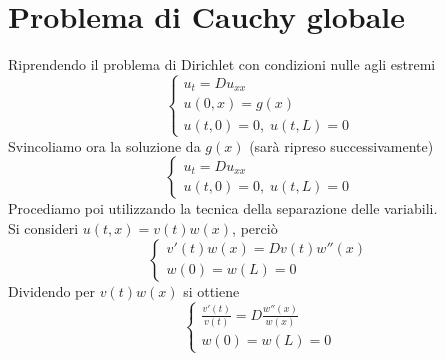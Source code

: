 \section{Problema di Cauchy globale}
Riprendendo il problema di Dirichlet con condizioni nulle agli estremi
\[
	\left\{
	\begin{array}{l}
		u_t=Du_{xx} \\
		u(0,x)=g(x) \\
		u(t,0)=0, \; u(t,L)=0
	\end{array}
	\right.
\]
Svincoliamo ora la soluzione da $g(x)$ (sar\`a ripreso successivamente)
\[
	\left\{
	\begin{array}{l}
		u_t=Du_{xx} \\
		u(t,0)=0, \; u(t,L)=0
	\end{array}
	\right.
\]
Procediamo poi utilizzando la tecnica della separazione delle variabili.\\
Si consideri $u(t,x)=v(t)w(x)$, perci\`o
\[
	\left\{
	\begin{array}{l}
		v'(t)w(x)=Dv(t)w''(x) \\
		w(0)=w(L)=0
	\end{array}
	\right.
\]
Dividendo per $v(t)w(x)$ si ottiene
\[
	\left\{
	\begin{array}{l}
		\displaystyle{\frac{v'(t)}{v(t)}=D\frac{w''(x)}{w(x)} }\\
		w(0)=w(L)=0
	\end{array}
	\right.
\]
